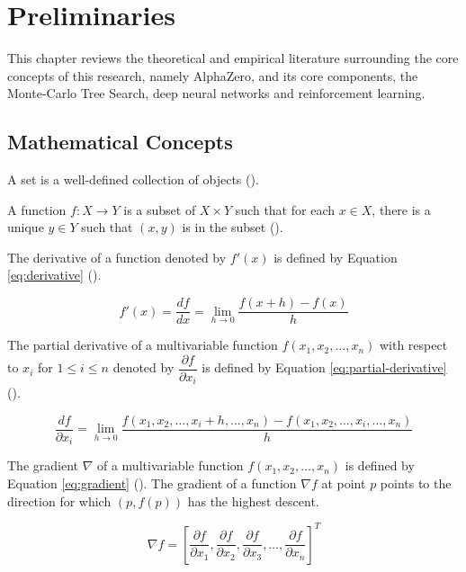 \chapter{Preliminaries}

This chapter reviews the theoretical and empirical literature surrounding the core concepts of this research, namely AlphaZero, and its core components, the Monte-Carlo Tree Search, deep neural networks and reinforcement learning.

\section{Mathematical Concepts}

A set is a well-defined collection of objects (\cite{diestel2024graph}).

A function $f: X \to Y$ is a subset of $X \times Y$ such that for each $x \in X$, there is a unique $y \in Y$ such that $(x, y) $ is in the subset (\cite{thielman1953definition}).

The derivative of a function denoted by $f'(x)$ is defined by Equation \ref{eq:derivative} (\cite{leithold1972calculus}).

\begin{equation}
    f'(x) = \frac{df}{dx} = \lim_{h \to 0} \frac{f(x+h) - f(x)}{h}
    \label{eq:derivative}
\end{equation}

The partial derivative of a multivariable function $f(x_1, x_2, \ldots, x_n)$ with respect to $x_i$ for $1 \le i \le n$ denoted by $\dfrac{\partial f}{\partial x_i}$ is defined by Equation \ref{eq:partial-derivative} (\cite{widder2012advanced}).

\begin{equation}
    \frac{df}{\partial x_i} = \lim_{h \to 0} \frac{f(x_1, x_2, \ldots, x_i + h, \ldots, x_n) - f(x_1, x_2, \ldots, x_i, \ldots, x_n)}{h}
    \label{eq:partial-derivative}
\end{equation}

The gradient $\nabla$ of a multivariable function $f(x_1, x_2, \ldots, x_n)$ is defined by Equation \ref{eq:gradient} (\cite{calder2020calculus}). The gradient of a function $\nabla f$ at point $p$ points to the direction for which $(p, f(p))$ has the highest descent.

\begin{equation}
    \nabla f = \left[\dfrac{\partial f}{\partial x_{1}}, \dfrac{\partial f}{\partial x_{2}}, \dfrac{\partial f}{\partial x_{3}}, \ldots, \dfrac{\partial f}{\partial x_{n}} \right]^T
    \label{eq:gradient}
\end{equation}

